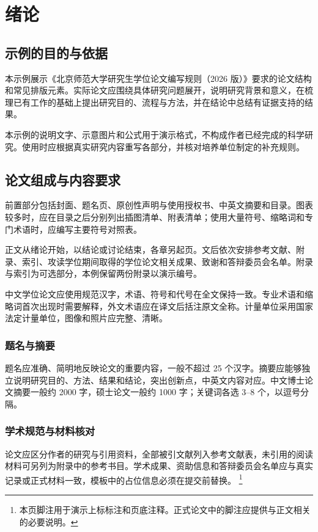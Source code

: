 
\chapter{绪论}

\section{示例的目的与依据}

本示例展示《北京师范大学研究生学位论文编写规则（2026 版）》要求的论文结构和常见排版元素。实际论文应围绕具体研究问题展开，说明研究背景和意义，在梳理已有工作的基础上提出研究目的、流程与方法，并在结论中总结有证据支持的结果。

本示例的说明文字、示意图片和公式用于演示格式，不构成作者已经完成的科学研究。使用时应根据真实研究内容重写各部分，并核对培养单位制定的补充规则。

\section{论文组成与内容要求}

前置部分包括封面、题名页、原创性声明与使用授权书、中英文摘要和目录。图表较多时，应在目录之后分别列出插图清单、附表清单；使用大量符号、缩略词和专门术语时，应编写主要符号对照表。

正文从绪论开始，以结论或讨论结束，各章另起页。文后依次安排参考文献、附录、索引、攻读学位期间取得的学位论文相关成果、致谢和答辩委员会名单。附录与索引为可选部分，本例保留两份附录以演示编号。

中文学位论文应使用规范汉字，术语、符号和代号在全文保持一致。专业术语和缩略词首次出现时需要解释，外文术语应在译文后括注原文全称。计量单位采用国家法定计量单位，图像和照片应完整、清晰。

\subsection{题名与摘要}

题名应准确、简明地反映论文的重要内容，一般不超过 25 个汉字。摘要应能够独立说明研究目的、方法、结果和结论，突出创新点，中英文内容对应。中文博士论文摘要一般约 2000 字，硕士论文一般约 1000 字；关键词各选 3--8 个，以逗号分隔。

\subsection{学术规范与材料核对}

论文应区分作者的研究与引用资料，全部被引文献列入参考文献表，未引用的阅读材料可另列为附录中的参考书目。学术成果、资助信息和答辩委员会名单应与真实记录或正式材料一致，模板中的占位信息必须在提交前替换。
\footnote{本页脚注用于演示上标标注和页底注释。正式论文中的脚注应提供与正文相关的必要说明。}

